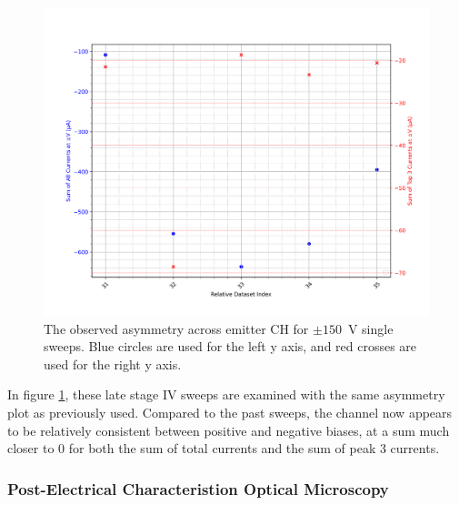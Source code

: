 \begin{refsection}
\begin{figure}[H]
    \centering
    \includegraphics[width=\linewidth]{Chapter7/Figs/Raster/Emitters/160-164_asymmetry.png}
    \caption{The observed asymmetry across emitter CH for $\pm150$~\si{\volt} single sweeps. Blue circles are used for the left y axis, and red crosses are used for the right y axis.}
    \label{fig:e_ch_160-164_asymmetry}
\end{figure}

In figure \ref{fig:e_ch_160-164_asymmetry}, these late stage IV sweeps are examined with the same asymmetry plot as previously used. Compared to the past sweeps, the channel now appears to be relatively consistent between positive and negative biases, at a sum much closer to 0 for both the sum of total currents and the sum of peak 3 currents.

\subsubsection{Post-Electrical Characteristion Optical Microscopy}


\end{refsection}
